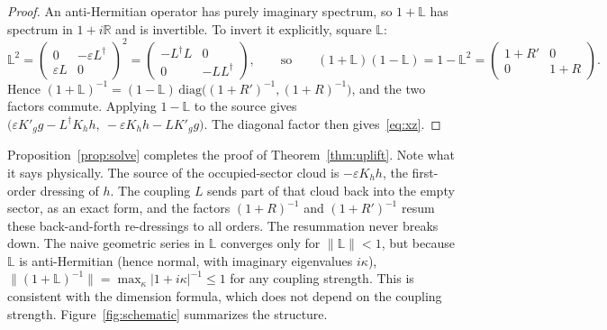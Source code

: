 \documentclass[11pt]{article}
\newcommand{\eps}{\varepsilon}
\newcommand{\LL}{\mathbb L}
\newcommand{\Kh}{K_h}
\newcommand{\Kg}{{K'_g}}
\theoremstyle{plain}
\theoremstyle{remark}
\numberwithin{equation}{section}
\begin{document}
\begin{proof}
An anti-Hermitian operator has purely imaginary spectrum, so $1+\LL$ has spectrum in $1+i\mathbb R$ and is invertible.
To invert it explicitly, square $\LL$:
\[
\LL^2=\begin{pmatrix}0&-\eps L^\dagger\\ \eps L&0\end{pmatrix}^{\!2}=\begin{pmatrix}-L^\dagger L&0\\0&-LL^\dagger\end{pmatrix},
\qquad\text{so}\qquad (1+\LL)(1-\LL)=1-\LL^2=\begin{pmatrix}1+R'&0\\0&1+R\end{pmatrix}.
\]
Hence $(1+\LL)^{-1}=(1-\LL)\,\mathrm{diag}\big((1+R')^{-1},(1+R)^{-1}\big)$, and the two factors commute. Applying
$1-\LL$ to the source gives $\big(\eps\Kg g-L^\dagger\Kh h,\ -\eps\Kh h-L\Kg g\big)$. The diagonal factor then
gives~\eqref{eq:xz}.
\end{proof}

Proposition~\ref{prop:solve} completes the proof of Theorem~\ref{thm:uplift}. Note what it says physically. The source of
the occupied-sector cloud is $-\eps\Kh h$, the first-order dressing of $h$. The coupling $L$ sends part of that cloud back
into the empty sector, as an exact form, and the factors $(1+R)^{-1}$ and $(1+R')^{-1}$ resum these back-and-forth
re-dressings to all orders. The resummation never breaks down. The naive geometric series in $\LL$ converges only for
$\|\LL\|<1$, but because $\LL$ is anti-Hermitian (hence normal, with imaginary eigenvalues $i\kappa$),
$\|(1+\LL)^{-1}\|=\max_\kappa|1+i\kappa|^{-1}\le1$ for any coupling strength. This is consistent with the dimension
formula, which does not depend on the coupling strength. Figure~\ref{fig:schematic} summarizes the structure.
\end{document}
